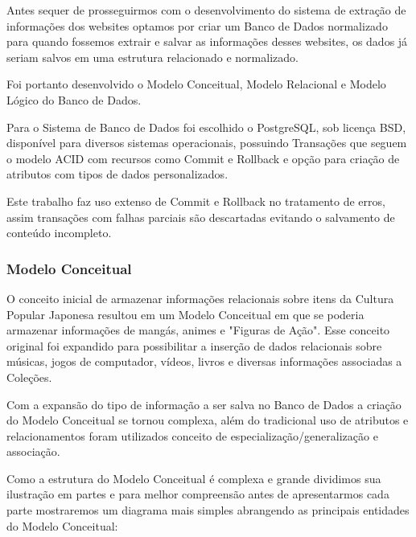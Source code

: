 \documentclass[12pt]{article}
\begin{document}
Antes sequer de prosseguirmos com o desenvolvimento do sistema de extração de informações dos websites optamos por criar um Banco de Dados normalizado para quando fossemos extrair e salvar as informações desses websites, os dados já seriam salvos em uma estrutura relacionado e normalizado.

Foi portanto desenvolvido o Modelo Conceitual, Modelo Relacional e Modelo Lógico do Banco de Dados.

Para o Sistema de Banco de Dados foi escolhido o PostgreSQL, sob licença BSD, disponível para diversos sistemas operacionais, possuindo Transações que seguem o modelo ACID com recursos como Commit e Rollback e opção para criação de atributos com tipos de dados personalizados. 

Este trabalho faz uso extenso de Commit e Rollback no tratamento de erros, assim transações com falhas parciais são descartadas evitando o salvamento de conteúdo incompleto.


\subsubsection{Modelo Conceitual}

O conceito inicial de armazenar informações relacionais sobre itens da Cultura Popular Japonesa resultou em um Modelo Conceitual em que se poderia armazenar informações de mangás, animes e "Figuras de Ação". Esse conceito original foi expandido para possibilitar a inserção de dados relacionais sobre músicas, jogos de computador, vídeos, livros e diversas informações associadas a Coleções. 

Com a expansão do tipo de informação a ser salva no Banco de Dados a criação do Modelo Conceitual se tornou complexa, além do tradicional uso de atributos e relacionamentos foram utilizados conceito de especialização/generalização e associação. 

Como a estrutura do Modelo Conceitual é complexa e grande dividimos sua ilustração em partes e para melhor compreensão antes de apresentarmos cada parte mostraremos um diagrama mais simples abrangendo as principais entidades do Modelo Conceitual:
\end{document}
